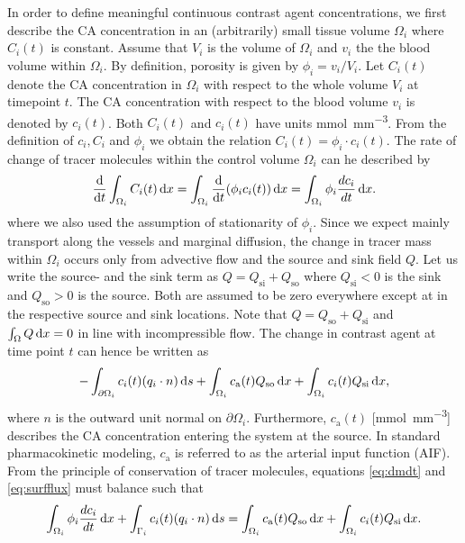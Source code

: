 \documentclass[paper=a4, fontsize=11pt,parskip=half,headings=small]{scrartcl}
\newcommand{\Qso}{Q_{\mathrm{so}}}
\newcommand{\Qsi}{Q_{\mathrm{si}}}
\newcommand{\ca}{c_\mathrm{a}}
\newcommand{\sic}{\milli\mol\per\milli\meter\cubed}
\begin{document}
	In order to define meaningful continuous contrast agent concentrations, we first describe the CA concentration in an (arbitrarily) small tissue volume $\Omega_i$ where $C_i(t)$ is constant.
	Assume that $V_i$ is the volume of $\Omega_i$ and $v_i$ the the blood volume within $\Omega_i$.
	By definition, porosity is given by $\phi_i = v_i/V_i$.
	Let $C_i(t)$ denote the CA concentration in $\Omega_i$ with respect to the whole volume $V_i$ at timepoint $t$.
	The CA concentration with respect to the blood volume $v_i$ is denoted by $c_i(t)$.
	Both $C_i(t)$ and $c_i(t)$ have units \si{\sic}. 
	From the definition of $c_i,C_i$ and $\phi_i$ we obtain the relation $C_i(t) = \phi_i \cdot c_i(t)$.
	The rate of change of tracer molecules within the control volume $\Omega_i$ can he described by
	\begin{equation}
		\frac{\mathrm{d}}{\mathrm{d} t}\int_{\Omega_i}C_i(t) \,\mathrm{d} x = \int_{\Omega_i}\frac{\mathrm{d}}{\mathrm{d} t}(\phi_i c_i(t)) \,\mathrm{d} x = \int_{\Omega_i} \phi_i \frac{d c_i}{dt}\,\mathrm{d} x.
		\label{eq:dmdt}
	\end{equation}	
	where we also used the assumption of stationarity of $\phi_i$.
	Since we expect mainly transport along the vessels and marginal diffusion, the change in tracer mass within $\Omega_i$ occurs only from advective flow and the source and sink field $Q$.
	Let us write the source- and the sink term as $Q = \Qsi + \Qso$ where $\Qsi < 0$ is the sink and $\Qso > 0$ is the source. 
	Both are assumed to be zero everywhere except at in the respective source and sink locations.
	Note that $Q = \Qso + \Qsi$ and $\int_\Omega Q \,\mathrm{d} x = 0$ in line with incompressible flow. 
	The change in contrast agent at time point $t$ can hence be written as
	\begin{equation}
		-\int_{ \partial \Omega_i}c_i(t)(q_i \cdot n)\diffint s + \int_{\Omega_i}\ca(t) \Qso \diffint x + \int_{\Omega_i}c_i(t)\Qsi \diffint x,
		\label{eq:surfflux}
	\end{equation}
	where $n$ is the outward unit normal on $\partial \Omega_i$.
	Furthermore, $\ca(t)$ [\si{\sic}] describes the CA concentration entering the system at the source. 
	In standard pharmacokinetic modeling, $\ca$ is referred to as the arterial input function (AIF).
	From the principle of conservation of tracer molecules, equations \eqref{eq:dmdt} and \eqref{eq:surfflux} must balance such that
	\begin{equation}
		\int_{\Omega_i} \phi_i \frac{d c_i}{dt} \diffint x + \int_{ \Gamma_i}c_i(t)(q_i \cdot n) \diffint s = \int_{\Omega_i}\ca(t)\Qso \diffint x + \int_{\Omega_i}c_i(t) \Qsi \diffint x.
		\label{eq:conteq}
	\end{equation}
\end{document}
